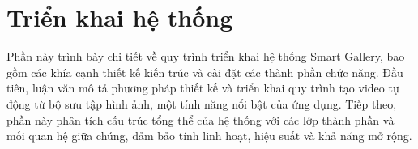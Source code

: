 \section{Triển khai hệ thống}

Phần này trình bày chi tiết về quy trình triển khai hệ thống Smart Gallery, bao gồm các khía cạnh thiết kế kiến trúc và cài đặt các thành phần chức năng. Đầu tiên, luận văn mô tả phương pháp thiết kế và triển khai quy trình tạo video tự động từ bộ sưu tập hình ảnh, một tính năng nổi bật của ứng dụng. Tiếp theo, phần này phân tích cấu trúc tổng thể của hệ thống với các lớp thành phần và mối quan hệ giữa chúng, đảm bảo tính linh hoạt, hiệu suất và khả năng mở rộng.



